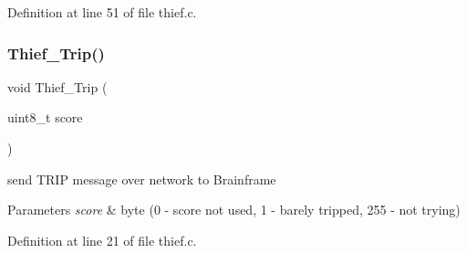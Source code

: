 Definition at line 51 of file thief.\+c.

\mbox{\label{group__thief_ga03f9659356dd27b2c363ec392788dc50}} 
\subsubsection{\texorpdfstring{Thief\_Trip()}{Thief\_Trip()}}
{\footnotesize\ttfamily void Thief\+\_\+\+Trip (\begin{DoxyParamCaption}\item[{uint8\+\_\+t}]{score }\end{DoxyParamCaption})}



send T\+R\+IP message over network to Brainframe 


\begin{DoxyParams}{Parameters}
{\em score} & byte (0 -\/ score not used, 1 -\/ barely tripped, 255 -\/ not trying) \\
\hline
\end{DoxyParams}


Definition at line 21 of file thief.\+c.

